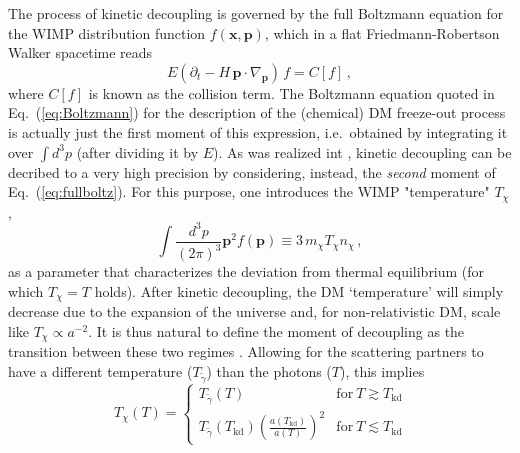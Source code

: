 \documentclass[a4paper,10pt,oneside]{book}
\newcommand{\be}{\begin{equation}}
\newcommand{\ee}{\end{equation}}
\begin{document}
The process of kinetic decoupling is governed by the full Boltzmann equation for the WIMP 
distribution function $f(\mathbf{x},\mathbf{p})$, which in 
a flat Friedmann-Robertson Walker spacetime reads
\begin{equation}
  \label{eq:fullboltz}
  E(\partial_t-H\,\mathbf{p}\cdot\nabla_\mathbf{p})\,f=C[f]\,,
\end{equation}
where $C[f]$ is known as the collision term.
The Boltzmann equation quoted in Eq.~(\ref{eq:Boltzmann}) for the description of 
the (chemical) DM freeze-out process is actually just the first moment of 
this expression, i.e.~obtained by integrating it over $\int d^3p$ (after dividing it by $E$). 
As was realized int \cite{Bringmann:2006mu,Bringmann:2009vf}, kinetic decoupling can be decribed to a very high precision 
by considering, instead, the \emph{second} moment of Eq.~(\ref{eq:fullboltz}). For this purpose,
one introduces the WIMP "temperature" $T_\chi$,
\begin{equation}
  \int\frac{d^3p}{(2\pi)^3}\mathbf{p}^2f(\mathbf{p})\equiv3\,m_\chi T_\chi n_\chi\,,
\end{equation}
as a parameter that characterizes the deviation from thermal equilibrium (for which 
$T_\chi=T$ holds). 
After kinetic
decoupling, the DM `temperature' will simply decrease due to the expansion of the universe and, 
for non-relativistic DM, scale like $T_\chi\propto a^{-2}$. It is thus natural
 to define the moment of decoupling as the transition between these two regimes \cite{Bringmann:2009vf}.
Allowing for the scattering partners to have a different temperature ($T_{\tilde\gamma}$) than the photons ($T$), this implies
\be
\label{TchiT}
\,T_\chi(T)=\left\{
\begin{array}{cc}
T_{\tilde\gamma}(T) & \mathrm{for}~T\gtrsim T_\mathrm{kd} \\
T_{\tilde\gamma} (T_\mathrm{kd})\left(\frac{a(T_\mathrm{kd})}{a(T)}\right)^2& \mathrm{for}~T\lesssim T_\mathrm{kd}
\end{array}
\right. 
\ee
\end{document}
